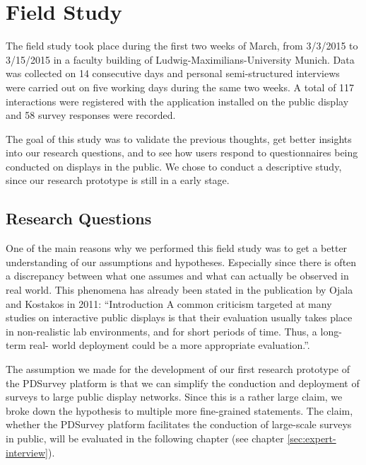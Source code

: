 \section{Field Study}
\label{sec:field-study}


	The field study took place during the first two weeks of March, from 3/3/2015 to 3/15/2015 in a faculty building of Ludwig-Maximilians-University Munich. Data was collected on 14 consecutive days and personal semi-structured interviews were carried out on five working days during the same two weeks. A total of 117 interactions were registered with the application installed on the public display and 58 survey responses were recorded.

	The goal of this study was to validate the previous thoughts, get better insights into our research questions, and to see how users respond to questionnaires being conducted on displays in the public. We chose to conduct a descriptive study, since our research prototype is still in a early stage.




\subsection{Research Questions}


	One of the main reasons why we performed this field study was to get a better understanding of our assumptions and hypotheses. Especially since there is often a discrepancy between what one assumes and what can actually be observed in real world. This phenomena has already been stated in the publication by Ojala and Kostakos in 2011: ``Introduction A common criticism targeted at many studies on interactive public displays is that their evaluation usually takes place in non-realistic lab environments, and for short periods of time. Thus, a long-term real- world deployment could be a more appropriate evaluation.''\cite{Ojala2011}.



	The assumption we made for the development of our first research prototype of the PDSurvey platform is that we can simplify the conduction and deployment of surveys to large public display networks. Since this is a rather large claim, we broke down the hypothesis to multiple more fine-grained statements. The claim, whether the PDSurvey platform facilitates the conduction of large-scale surveys in public, will be evaluated in the following chapter (see chapter \ref{sec:expert-interview}). 

